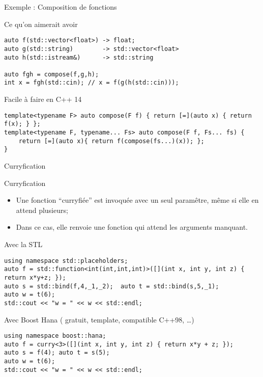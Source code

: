 \documentclass[handout,10pt]{beamer}
\begin{document}
\begin{frame}[fragile]{Exemple : Composition de fonctions}
 \begin{block}{Ce qu'on aimerait avoir}
\begin{lstlisting}
auto f(std::vector<float>) -> float;
auto g(std::string)        -> std::vector<float>
auto h(std::istream&)      -> std::string

auto fgh = compose(f,g,h);
int x = fgh(std::cin); // x = f(g(h(std::cin)));
\end{lstlisting}
\end{block}

\begin{block}{Facile à faire en C++ 14}
\begin{lstlisting}
template<typename F> auto compose(F f) { return [=](auto x) { return f(x); } };
template<typename F, typename... Fs> auto compose(F f, Fs... fs) {
    return [=](auto x){ return f(compose(fs...)(x)); };    
}
\end{lstlisting}
\end{block}
\end{frame}

\begin{frame}[fragile]{Curryfication}
\begin{block}{Curryfication}
\begin{itemize}
 \item Une fonction ``curryfiée'' est invoquée avec un seul paramêtre, même si elle en attend plusieurs;
 \item Dans ce cas, elle renvoie une fonction qui attend les arguments manquant.
\end{itemize}
\end{block}
\begin{block}{Avec la STL}
\begin{lstlisting}
using namespace std::placeholders;
auto f = std::function<int(int,int,int)>([](int x, int y, int z) { return x*y+z; });
auto s = std::bind(f,4,_1,_2);  auto t = std::bind(s,5,_1);
auto w = t(6);
std::cout << "w = " << w << std::endl;
\end{lstlisting}
\end{block}
\begin{block}{Avec Boost Hana ( gratuit, template, compatible C++98, \ldots ) }
\begin{lstlisting}
using namespace boost::hana;
auto f = curry<3>([](int x, int y, int z) { return x*y + z; });
auto s = f(4); auto t = s(5);
auto w = t(6);
std::cout << "w = " << w << std::endl;
\end{lstlisting}
\end{block}
\end{frame}
\end{document}
